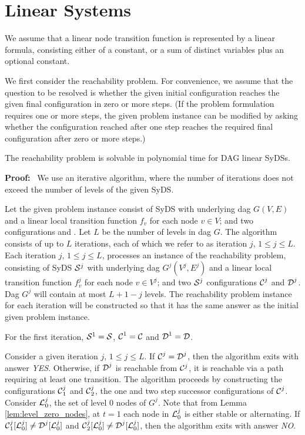 \section{Linear Systems}
\label{sec:linear_functions}

We assume that a linear node transition function is represented by a linear formula,
consisting either of a constant, or a sum of distinct variables plus an optional constant.

We first consider the reachability problem.
For convenience, we assume that the question to be resolved
is whether the given initial configuration reaches the given final configuration in zero or more steps.
(If the problem formulation requires one or more steps,
the given problem instance can be modified by asking whether the configuration reached after one step
reaches the required final configuration after zero or more steps.)

\begin{theorem}\label{thm:linear_systems_reachability}
The reachability problem is solvable in polynomial time  for DAG linear SyDSs.
\end{theorem}
\noindent
\textbf{Proof:}~ 
We use an iterative algorithm, 
where the number of iterations does not exceed the number of levels of the given SyDS.

Let the given problem instance consist of SyDS \cals{} 
with underlying dag $G(V,E)$ and a linear local transition function $f_v$ for each node $v \in V$;
and two configurations \calc{} and \cald.
Let $L$ be the number of levels in dag $G$.
The algorithm consists of up to $L$ iterations, 
each of which we refer to as iteration $j$, $1 \leq j \leq L$.
Each iteration $j$, $1 \leq j \leq L$, processes an instance of the reachability problem, 
consisting of SyDS $\mbox{$\mathcal{S}$}{}^j$
with underlying dag $G^j(V^j,E^j)$ 
and a linear local transition function $f^j_v$ for each node $v \in V^j$;
and two $\mbox{$\mathcal{S}$}{}^j$ configurations $\mbox{$\mathcal{C}$}^j$ and $\mbox{$\mathcal{D}$}^j$.
Dag $G^j$ will contain at most  $L+1-j$ levels.
The reachability problem instance for each iteration will be constructed  
so that it has the same answer as the initial given problem instance.


For the first iteration, $\mbox{$\mathcal{S}$}{}^1 = \mbox{$\mathcal{S}$}{}$, $\mbox{$\mathcal{C}$}^1 = \mbox{$\mathcal{C}$}$ and $\mbox{$\mathcal{D}$}^1 = \mbox{$\mathcal{D}$}$.

Consider a given iteration $j$, $1 \leq j \leq L$.
If $\mbox{$\mathcal{C}$}^j =\mbox{$\mathcal{D}$}^j $, then the algorithm exits with answer  {\em YES}.
Otherwise, if $\mbox{$\mathcal{D}$}^j $ is reachable from $\mbox{$\mathcal{C}$}{}^j$,
it is reachable via a path requiring at least one transition.
The algorithm proceeds by constructing the configurations $\mbox{$\mathcal{C}$}^j_1$ and $\mbox{$\mathcal{C}$}^j_2$,
the one and two step successor configurations of $\mbox{$\mathcal{C}$}^j$.
Consider $\mbox{$\mathcal{L}$}_0^j$, the set of level 0 nodes of $G^j$.
Note that from Lemma \ref{lem:level_zero_nodes},
at $t=1$ each node in $\mbox{$\mathcal{L}$}_0^j$ is either stable or alternating.
If $\mbox{$\mathcal{C}$}^j_1[\mbox{$\mathcal{L}$}_0^j] \neq \mbox{$\mathcal{D}$}^j[\mbox{$\mathcal{L}$}_0^j]$ and $\mbox{$\mathcal{C}$}^j_2[\mbox{$\mathcal{L}$}_0^j] \neq \mbox{$\mathcal{D}$}^j[\mbox{$\mathcal{L}$}_0^j]$,
then the algorithm exits with answer  {\em NO}.

